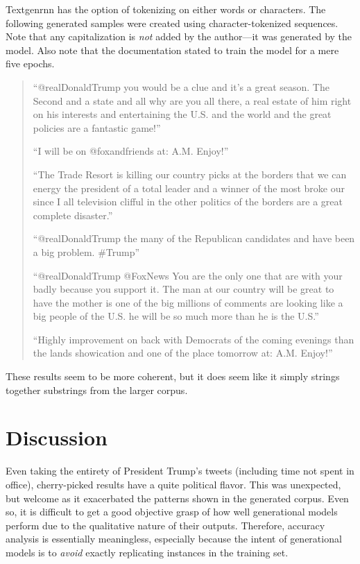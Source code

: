 \documentclass[letterpaper]{article}
\begin{document}
        Textgenrnn has the option of tokenizing on either words or characters. The following generated samples were created using character-tokenized sequences. Note that any capitalization is \textit{not} added by the author---it was generated by the model. Also note that the documentation stated to train the model for a mere five epochs.

        \begin{quote}
            ``@realDonaldTrump you would be a clue and it's a great season. The Second and a state and all why are you all there, a real estate of him right on his interests and entertaining the U.S. and the world and the great policies are a fantastic game!''

            ``I will be on @foxandfriends at: A.M. Enjoy!''

            ``The Trade Resort is killing our country picks at the borders that we can energy the president of a total leader and a winner of the most broke our since I all television clifful in the other politics of the borders are a great complete disaster.''

            ``@realDonaldTrump the many of the Republican candidates and have been a big problem. \#Trump''

            ``@realDonaldTrump @FoxNews  You are the only one that are with your badly because you support it. The man at our country will be great to have the mother is one of the big millions of comments are looking like a big people of the U.S. he will be so much more than he is the U.S.''

            ``Highly improvement on back with Democrats of the coming evenings than the lands showication and one of the place tomorrow at: A.M.  Enjoy!''
        \end{quote}

        These results seem to be more coherent, but it does seem like it simply strings together substrings from the larger corpus.

\section{Discussion}
    Even taking the entirety of President Trump's tweets (including time not spent in office), cherry-picked results have a quite political flavor. This was unexpected, but welcome as it exacerbated the patterns shown in the generated corpus. Even so, it is difficult to get a good objective grasp of how well generational models perform due to the qualitative nature of their outputs. Therefore, accuracy analysis is essentially meaningless, especially because the intent of generational models is to \textit{avoid} exactly replicating instances in the training set.
\end{document}
